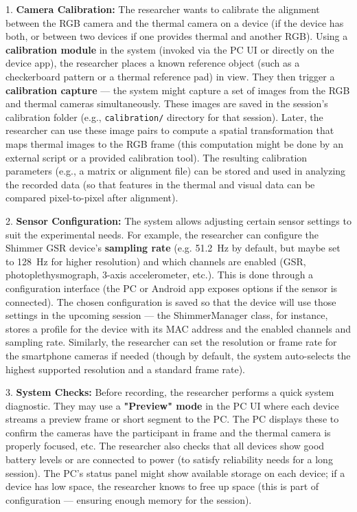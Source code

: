 \documentclass[11pt,a4paper]{report}
\begin{document}
1.  \textbf{Camera Calibration:} The researcher wants to calibrate the
    alignment between the RGB camera and the thermal camera on a device
    (if the device has both, or between two devices if one provides
    thermal and another RGB). Using a \textbf{calibration module} in the
    system (invoked via the PC UI or directly on the device app), the
    researcher places a known reference object (such as a checkerboard
    pattern or a thermal reference pad) in view. They then trigger a
    \textbf{calibration capture} --- the system might capture a set of images
    from the RGB and thermal cameras simultaneously. These images are
    saved in the session's calibration folder (e.g., \texttt{calibration/}
    directory for that
    session)\cite{StressDefinitionHH}\cite{CortisolStressIndicator2020}.
    Later, the researcher can use these image pairs to compute a spatial
    transformation that maps thermal images to the RGB frame (this
    computation might be done by an external script or a provided
    calibration tool). The resulting calibration parameters (e.g., a
    matrix or alignment file) can be stored and used in analyzing the
    recorded data (so that features in the thermal and visual data can
    be compared pixel-to-pixel after alignment).

2.  \textbf{Sensor Configuration:} The system allows adjusting certain sensor
    settings to suit the experimental needs. For example, the researcher
    can configure the Shimmer GSR device's \textbf{sampling rate} (e.g.
    51.2 Hz by default, but maybe set to 128 Hz for higher resolution)
    and which channels are enabled (GSR, photoplethysmograph, 3-axis
    accelerometer,
    etc.)\cite{ElectrodermalActivityWiki}\cite{ContactlessStressThermal2022}.
    This is done through a configuration interface (the PC or Android
    app exposes options if the sensor is connected). The chosen
    configuration is saved so that the device will use those settings in
    the upcoming session --- the ShimmerManager class, for instance, stores a
    profile for the device with its MAC address and the enabled channels
    and sampling
    rate\cite{ContactlessStressThermal2022}.
    Similarly, the researcher can set the resolution or frame rate for
    the smartphone cameras if needed (though by default, the system
    auto-selects the highest supported resolution and a standard frame
    rate).

3.  \textbf{System Checks:} Before recording, the researcher performs a quick
    system diagnostic. They may use a \textbf{"Preview" mode} in the PC UI
    where each device streams a preview frame or short segment to the
    PC. The PC displays these to confirm the cameras have the
    participant in frame and the thermal camera is properly focused,
    etc. The researcher also checks that all devices show good battery
    levels or are connected to power (to satisfy reliability needs for a
    long session). The PC's status panel might show available storage on
    each device; if a device has low space, the researcher knows to free
    up space (this is part of configuration --- ensuring enough memory
    for the session).
\end{document}
